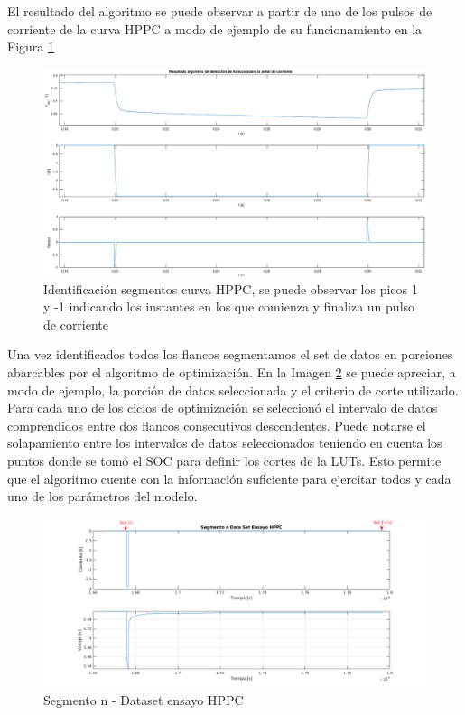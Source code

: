 \documentclass[10pt, a4paper]{article}
\begin{document}
El resultado del algoritmo se puede observar a partir de uno de los pulsos de
corriente de la curva \acrshort{HPPC} a modo de ejemplo de su funcionamiento en
la Figura \ref{flank_seg_hppc}

\begin{figure}[h!]
    \begin{center}
        \includegraphics[width=.8\textwidth]{flank_seg_hppc.eps}
        \caption{Identificación segmentos curva
        \acrshort{HPPC}, se puede observar los picos 1 y -1 indicando los
        instantes en los que comienza y finaliza un pulso de corriente}
        \label{flank_seg_hppc}
    \end{center}
\end{figure}
\FloatBarrier

Una vez identificados todos los flancos segmentamos el set de datos en porciones
abarcables por el algoritmo de optimización. En la Imagen
\ref{fig:data_seg_hppc} se puede apreciar, a modo de ejemplo, la porción de
datos seleccionada y el criterio de corte utilizado. Para cada uno de los ciclos
de optimización se seleccionó el intervalo de datos comprendidos entre dos
flancos consecutivos descendentes. Puede notarse el solapamiento entre los
intervalos de datos seleccionados teniendo en cuenta los puntos donde se tomó el
\acrshort{SOC} para definir los cortes de la \acrshort{LUT}s. Esto permite que
el algoritmo cuente con la información suficiente para ejercitar todos y cada
uno de los parámetros del modelo.

\begin{figure}[h!]
    \centering
        \includegraphics[width=1\textwidth]{data_seg_hppc.png}
        \caption{Segmento n - Dataset ensayo \acrshort{HPPC}}
        \label{fig:data_seg_hppc}
\end{figure}
\FloatBarrier
\end{document}
